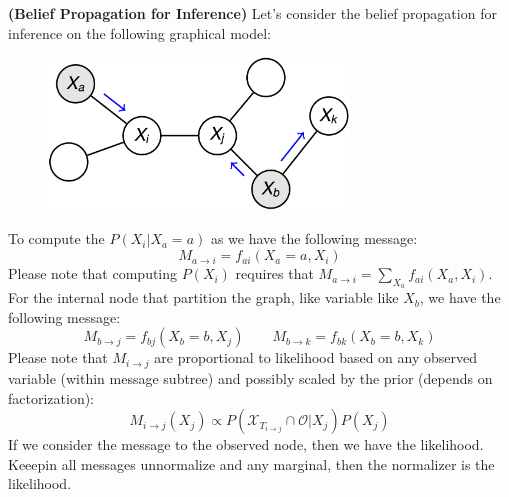 \begin{remark}{\textbf{(Belief Propagation for Inference)}}
    Let's consider the belief propagation for inference on the following graphical model:
    \begin{figure}[H]
        \centering
        \includegraphics[width=8cm]{img/img7.png}
    \end{figure}  
    To compute the $P(X_i | X_a = a)$ as we have the following message:
    \begin{equation*}
        M_{a\rightarrow i} = f_{ai}(X_a = a, X_i)
    \end{equation*}
    Please note that computing $P(X_i)$ requires that $M_{a\rightarrow i} = \sum_{X_a}f_{ai}(X_a, X_i)$. 
    For the internal node that partition the graph, like variable like $X_b$, we have the following message:
    \begin{equation*}
        M_{b\rightarrow j} = f_{bj}(X_b = b, X_j) \qquad M_{b\rightarrow k} = f_{bk}(X_b = b, X_k)
    \end{equation*}
    Please note that $M_{i\rightarrow j}$ are proportional to likelihood based on any observed variable (within message subtree) and possibly scaled by the prior (depends on factorization):
    \begin{equation*}
        M_{i\rightarrow j}(X_j) \propto P(\mathcal{X}_{T_{i\rightarrow j}}\cap\mathcal{O} | X_j)P(X_j)
    \end{equation*}
    If we consider the message to the observed node, then we have the likelihood. Keeepin all messages unnormalize and any marginal, then the normalizer is the likelihood. 
\end{remark}

